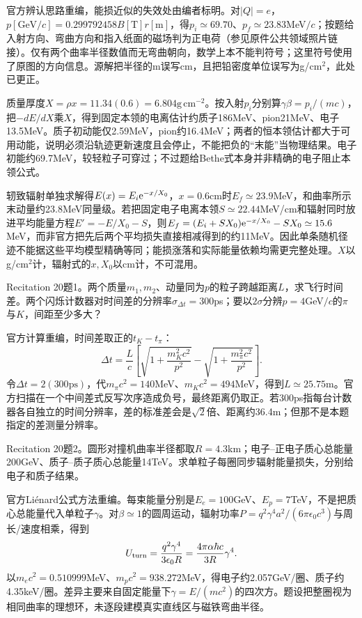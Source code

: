 \begin{solution}
官方辨认思路重编，能损近似的失效处由编者标明。对$|Q|=e$，$p[\mathrm{GeV}/c]=0.299792458B[\mathrm T]r[\mathrm m]$，得$p_i\simeq69.70$、$p_f\simeq23.83$MeV$/c$；按题给入射方向、弯曲方向和指入纸面的磁场判为正电荷（参见原件公共领域照片链接）。仅有两个曲率半径数值而无弯曲朝向，数学上本不能判符号；这里符号使用了原图的方向信息。源解把半径的m误写cm，且把铅密度单位误写为g/cm$^2$，此处已更正。

质量厚度$X=\rho x=11.34(0.6)=6.804\mathrm{g\,cm^{-2}}$。按入射$p_i$分别算$\gamma\beta=p_i/(mc)$，把$-dE/dX$乘$X$，得到固定本领的电离估计约质子186MeV、pion21MeV、电子13.5MeV。质子初动能仅2.59MeV，pion约16.4MeV；两者的恒本领估计都大于可用动能，说明必须沿轨迹更新速度且会停止，不能把负的“末能”当物理结果。电子初能约69.7MeV，较轻粒子可穿过；不过题给Bethe式本身并非精确的电子阻止本领公式。

轫致辐射单独求解得$E(x)=E_i\mathrm e^{-x/X_0}$，$x=0.6$cm时$E_f\simeq23.9$MeV，和曲率所示末动量约23.8MeV同量级。若把固定电子电离本领$S\simeq22.44$MeV/cm和辐射同时放进平均能量方程$E'=-E/X_0-S$，则$E_f=(E_i+SX_0)\mathrm e^{-x/X_0}-SX_0\simeq15.6$MeV，而非官方把先后两个平均损失直接相减得到的约11MeV。因此单条随机径迹不能据这些平均模型精确等同；能损涨落和实际能量依赖均需更完整处理。$X$以g/cm$^2$计，辐射式的$x,X_0$以cm计，不可混用。
\end{solution}
\begin{exercise}\label{ex:rec-20-1}
Recitation 20题1。两个质量$m_1,m_2$、动量同为$p$的粒子跨越距离$L$，求飞行时间差。两个闪烁计数器对时间差的分辨率$\sigma_{\Delta t}=300$ps；要以$2\sigma$分辨$p=4$GeV$/c$的$\pi$与$K$，间距至少多大？
\end{exercise}
\begin{solution}
官方计算重编，时间差取正的$t_K-t_\pi$：
\begin{equation}
\Delta t=\frac Lc\left[\sqrt{1+\frac{m_K^2c^2}{p^2}}-\sqrt{1+\frac{m_\pi^2c^2}{p^2}}\right].
\end{equation}
令$\Delta t=2(300\mathrm{ps})$，代$m_\pi c^2=140$MeV、$m_Kc^2=494$MeV，得到$L\simeq25.75$m。官方扫描在一个中间差式反写次序造成负号，最终距离仍取正。若300ps指每台计数器各自独立的时间分辨率，差的标准差会是$\sqrt2$倍、距离约36.4m；但那不是本题指定的差测量分辨率。
\end{solution}
\begin{exercise}\label{ex:rec-20-2}
Recitation 20题2。圆形对撞机曲率半径都取$R=4.3$km；电子--正电子质心总能量200GeV、质子--质子质心总能量14TeV。求单粒子每圈同步辐射能量损失，分别给电子和质子结果。
\end{exercise}
\begin{solution}
官方Liénard公式方法重编。每束能量分别是$E_e=100$GeV、$E_p=7$TeV，不是把质心总能量代入单粒子$\gamma$。对$\beta\simeq1$的圆周运动，辐射功率$P=q^2\gamma^4a^2/(6\pi\epsilon_0c^3)$与周长/速度相乘，得到
\begin{equation}U_{\rm turn}=\frac{q^2\gamma^4}{3\epsilon_0R}=\frac{4\pi\alpha\hbar c}{3R}\gamma^4.
\end{equation}
以$m_ec^2=0.510999$MeV、$m_pc^2=938.272$MeV，得电子约2.057GeV/圈、质子约4.35keV/圈。差异主要来自固定能量下$\gamma=E/(mc^2)$的四次方。题设把整圈视为相同曲率的理想环，未逐段建模真实直线区与磁铁弯曲半径。
\end{solution}
